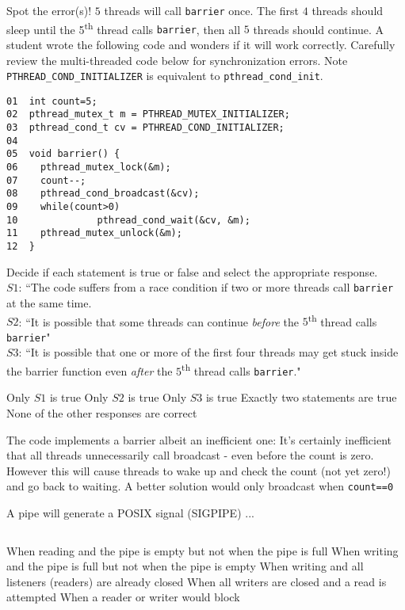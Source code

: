 \variant
Spot the error(s)! $5$ threads will call {\tt barrier} once. The first $4$ threads should sleep until the 5\textsuperscript{th}  thread calls {\tt barrier}, then all $5$ threads should continue. A student wrote the following code and wonders if it will work correctly.
Carefully review the multi-threaded code below for synchronization errors. Note {\tt PTHREAD_COND_INITIALIZER} is equivalent to {\tt pthread_cond_init}.
\begin{verbatim}
01  int count=5;
02  pthread_mutex_t m = PTHREAD_MUTEX_INITIALIZER;
03  pthread_cond_t cv = PTHREAD_COND_INITIALIZER; 
04
05  void barrier() { 
06    pthread_mutex_lock(&m);
07    count--;
08    pthread_cond_broadcast(&cv);
09    while(count>0) 
10              pthread_cond_wait(&cv, &m);
11    pthread_mutex_unlock(&m);
12  }
\end{verbatim}
Decide if each statement is true or false and select the appropriate response.\\
$S1$:  ``The code suffers from a race condition if two or more threads call {\tt barrier} at the same time.\\
$S2$:  ``It is possible that some threads can continue {\em before} the $5$\textsuperscript{th} thread calls {\tt barrier}"\\
$S3$:  ``It is possible that one or more of the first four threads may get stuck inside the barrier function even {\em after} the $5$\textsuperscript{th} thread calls {\tt barrier}."

\begin{answers}
\answer Only $S1$ is true
\answer Only $S2$ is true
\answer Only $S3$ is true
\answer Exactly two statements are true
\correctanswer None of the other responses are correct
\end{answers}
\begin{solution}
The code implements a barrier albeit an inefficient one: It's certainly inefficient that all threads unnecessarily call broadcast - even before the count is zero. However this will cause threads to wake up and check the count (not yet zero!) and go back to waiting. A better solution would only broadcast when {\tt count==0}
\end{solution}





\variant
A pipe will generate a POSIX signal (SIGPIPE) ...
\begin{verbatim}
\end{verbatim}
\begin{answers}
\answer When reading and the pipe is empty but not when the pipe is full
\answer When writing and the pipe is full but not when the pipe is empty
\correctanswer When writing and all listeners (readers) are already closed
\answer When all writers are closed and a read is attempted
\answer When a reader or writer would block
\end{answers}
\begin{solution}
\end{solution}


